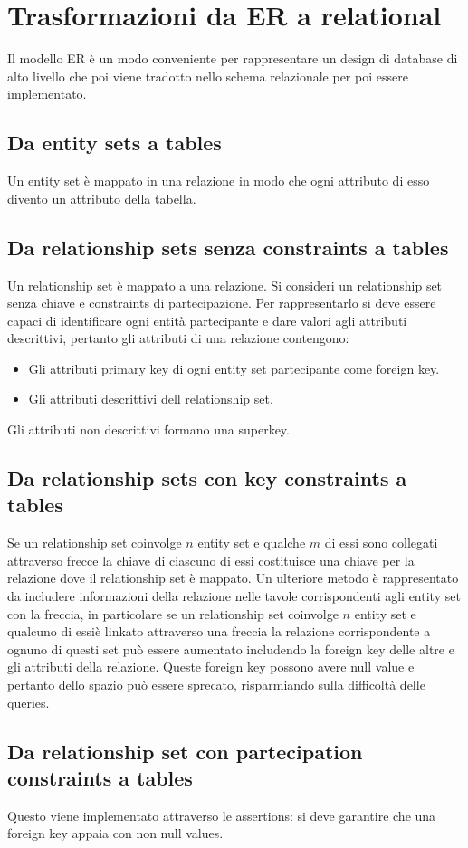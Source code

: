 \section{Trasformazioni da ER a relational}
Il modello ER \`e un modo conveniente per rappresentare un design di database di alto livello che poi viene tradotto nello schema relazionale per poi essere implementato.
\subsection{Da entity sets a tables}
Un entity set \`e mappato in una relazione in modo che ogni attributo di esso divento un attributo della tabella. 
\subsection{Da relationship sets senza constraints a tables}
Un relationship set \`e mappato a una relazione. Si consideri un relationship set senza chiave e constraints di partecipazione. Per rappresentarlo si deve essere capaci di identificare ogni entit\`a partecipante
e dare valori agli attributi descrittivi, pertanto gli attributi di una relazione contengono: 
\begin{itemize}
\item Gli attributi primary key di ogni entity set partecipante come foreign key.
\item Gli attributi descrittivi dell relationship set.
\end{itemize}
Gli attributi non descrittivi formano una superkey.
\subsection{Da relationship sets con key constraints a tables}
Se un relationship set coinvolge $n$ entity set e qualche $m$ di essi sono collegati attraverso frecce la chiave di ciascuno di essi costituisce una chiave per la relazione dove il relationship set \`e mappato. Un 
ulteriore metodo \`e rappresentato da includere informazioni della relazione nelle tavole corrispondenti agli entity set con la freccia, in particolare se un relationship set coinvolge $n$ entity set e qualcuno di 
essi\`e linkato attraverso una freccia la relazione corrispondente a ognuno di questi set pu\`o essere aumentato includendo la foreign key delle altre e gli attributi della relazione. Queste foreign key possono 
avere null value e pertanto dello spazio pu\`o essere sprecato, risparmiando sulla difficolt\`a delle queries. 
\subsection{Da relationship set con partecipation constraints a tables}
Questo viene implementato attraverso le assertions: si deve garantire che una foreign key appaia con non null values. 
